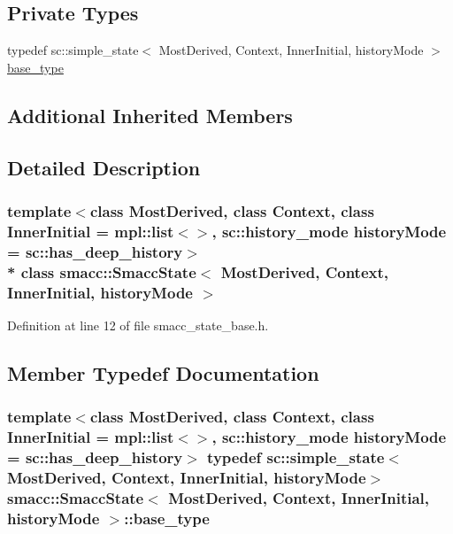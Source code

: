 \subsection*{Private Types}
\begin{DoxyCompactItemize}
\item 
typedef sc\+::simple\+\_\+state$<$ Most\+Derived, Context, Inner\+Initial, history\+Mode $>$ \hyperlink{classsmacc_1_1SmaccState_a68f547c6fe147554bbe607b6fcd8e40a}{base\+\_\+type}
\end{DoxyCompactItemize}
\subsection*{Additional Inherited Members}


\subsection{Detailed Description}
\subsubsection*{template$<$class Most\+Derived, class Context, class Inner\+Initial = mpl\+::list$<$$>$, sc\+::history\+\_\+mode history\+Mode = sc\+::has\+\_\+deep\+\_\+history$>$\\*
class smacc\+::\+Smacc\+State$<$ Most\+Derived, Context, Inner\+Initial, history\+Mode $>$}



Definition at line 12 of file smacc\+\_\+state\+\_\+base.\+h.



\subsection{Member Typedef Documentation}
\subsubsection[{\texorpdfstring{base\+\_\+type}{base_type}}]{\setlength{\rightskip}{0pt plus 5cm}template$<$class Most\+Derived, class Context, class Inner\+Initial = mpl\+::list$<$$>$, sc\+::history\+\_\+mode history\+Mode = sc\+::has\+\_\+deep\+\_\+history$>$ typedef sc\+::simple\+\_\+state$<$Most\+Derived, Context, Inner\+Initial, history\+Mode$>$ {\bf smacc\+::\+Smacc\+State}$<$ Most\+Derived, Context, Inner\+Initial, history\+Mode $>$\+::{\bf base\+\_\+type}\hspace{0.3cm}{\ttfamily [private]}}\hypertarget{classsmacc_1_1SmaccState_a68f547c6fe147554bbe607b6fcd8e40a}{}\label{classsmacc_1_1SmaccState_a68f547c6fe147554bbe607b6fcd8e40a}


